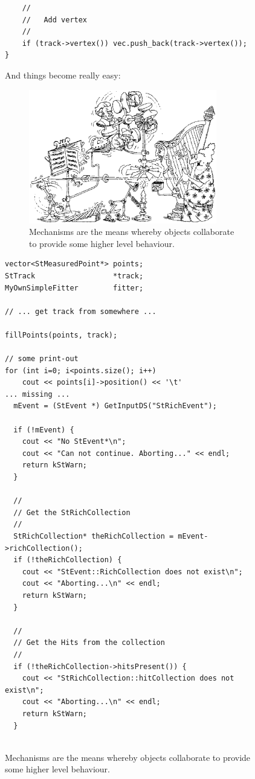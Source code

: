 \documentclass[twoside]{article}
\begin{document}
\begin{figure}[htb]
\begin{center}
\begin{verbatim}
    //
    //   Add vertex
    //
    if (track->vertex()) vec.push_back(track->vertex());
}
\end{verbatim}
And things become really easy:
\begin{figure}[tb]
    \begin{center}
        \includegraphics[width=0.9\textwidth]{cartoon7.eps}
        \caption{Mechanisms are the means whereby objects collaborate
            to provide some higher level behaviour.}
    \end{center}
\end{figure}
\begin{verbatim}
vector<StMeasuredPoint*> points;
StTrack                  *track;
MyOwnSimpleFitter        fitter;

// ... get track from somewhere ...

fillPoints(points, track);

// some print-out
for (int i=0; i<points.size(); i++)
    cout << points[i]->position() << '\t'
... missing ...
  mEvent = (StEvent *) GetInputDS("StRichEvent");

  if (!mEvent) {
    cout << "No StEvent*\n";
    cout << "Can not continue. Aborting..." << endl;
    return kStWarn;
  }

  //
  // Get the StRichCollection
  // 
  StRichCollection* theRichCollection = mEvent->richCollection();
  if (!theRichCollection) {
    cout << "StEvent::RichCollection does not exist\n";
    cout << "Aborting...\n" << endl;
    return kStWarn;
  }

  //
  // Get the Hits from the collection
  //
  if (!theRichCollection->hitsPresent()) {
    cout << "StRichCollection::hitCollection does not exist\n";
    cout << "Aborting...\n" << endl;
    return kStWarn;
  }


\end{verbatim}
\end{center}
\end{figure}
\end{document}
